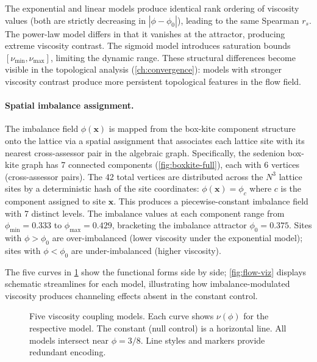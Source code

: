 \documentclass[12pt,openany]{report}
\theoremstyle{definition}
\theoremstyle{plain}
\theoremstyle{remark}
\begin{document}
The exponential and linear models produce identical rank ordering of
viscosity values (both are strictly decreasing in $|\phi - \phi_0|$),
leading to the same Spearman $r_s$.  The power-law model differs in that
it vanishes at the attractor, producing extreme viscosity contrast.  The
sigmoid model introduces saturation bounds $[\nu_{\min}, \nu_{\max}]$,
limiting the dynamic range.  These structural differences become visible
in the topological analysis (\cref{ch:convergence}): models with
stronger viscosity contrast produce more persistent topological features
in the flow field.

\paragraph{Spatial imbalance assignment.}
The imbalance field $\phi(\mathbf{x})$ is mapped from the box-kite
component structure onto the lattice via a spatial assignment that
associates each lattice site with its nearest cross-assessor pair in
the algebraic graph.  Specifically, the sedenion box-kite graph has
7 connected components (\cref{fig:boxkite-full}), each with 6 vertices
(cross-assessor pairs).  The 42 total vertices are distributed across
the $N^3$ lattice sites by a deterministic hash of the site coordinates:
$\phi(\mathbf{x}) = \phi_c$ where $c$ is the component assigned to
site $\mathbf{x}$.  This produces a piecewise-constant imbalance
field with 7 distinct levels.  The imbalance values at each component
range from $\phi_{\min} = 0.333$ to $\phi_{\max} = 0.429$, bracketing
the imbalance attractor $\phi_0 = 0.375$.  Sites with $\phi > \phi_0$ are
over-imbalanced (lower viscosity under the exponential model); sites
with $\phi < \phi_0$ are under-imbalanced (higher viscosity).

The five curves in
\cref{fig:coupling-curves} show the functional forms side by side;
\cref{fig:flow-viz} displays schematic streamlines for each model,
illustrating how imbalance-modulated viscosity produces channeling
effects absent in the constant control.

\begin{figure}[htbp]
\centering

\caption{Five viscosity coupling models.  Each curve shows
$\nu(\phi)$ for the respective model.  The constant (null control)
is a horizontal line.  All models intersect near $\phi = 3/8$.
Line styles and markers provide redundant encoding.}
\label{fig:coupling-curves}
\end{figure}
\end{document}

